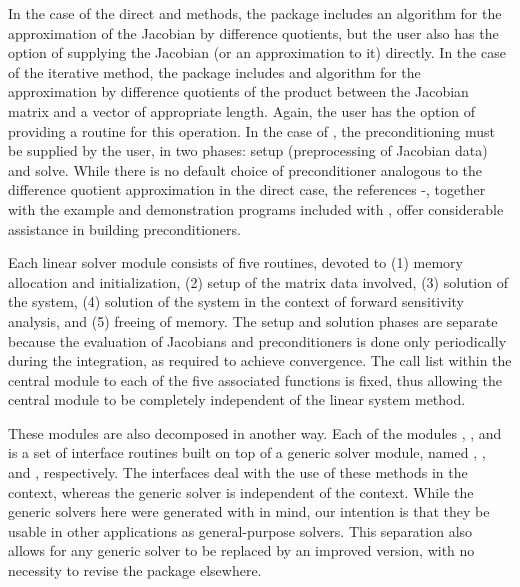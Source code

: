 In the case of the direct {\cvdense} and {\cvband} methods, the package includes
an algorithm for the approximation of the Jacobian by difference
quotients, but the user also has the option of supplying the Jacobian
(or an approximation to it) directly. In the case of the iterative
{\cvspgmr} method, the package includes and algorithm for the approximation
by difference quotients of the product between the Jacobian matrix and
a vector of appropriate length. Again, the user has the option of providing
a routine for this operation.
In  the case of {\cvspgmr}, 
the preconditioning must be supplied by the user, in two phases: 
setup (preprocessing of Jacobian data) and solve.
While there is no default
choice of preconditioner analogous to the difference quotient
approximation in the direct case, the references
\cite{BrHi:89}-\cite{Byr:92}, together with
the example and demonstration programs included with {\cvodes}, offer
considerable assistance in building preconditioners.

Each {\cvodes} linear solver module consists of five routines, devoted to (1)
memory allocation and initialization, (2) setup of the matrix data
involved, (3) solution of the system, (4) solution of the system in the
context of forward sensitivity analysis, and (5) freeing of memory.  The
setup and solution phases are separate because the evaluation of
Jacobians and preconditioners is done only periodically during the
integration, as required to achieve convergence. The call list within
the central {\cvodes} module to each of the five associated functions is
fixed, thus allowing the central module to be completely independent
of the linear system method.

These modules are also decomposed in another way.
Each of the modules {\cvdense}, {\cvband}, and {\cvspgmr} is a set of 
interface routines built on top of a generic solver module, 
named {\dense}, {\band}, and {\spgmr}, respectively.  
The interfaces deal with the use of these methods in the {\cvodes} context, 
whereas the generic solver is independent of the context.
While the generic solvers here were generated with {\sundials} in mind, our
intention is that they be usable in other applications as
general-purpose solvers.  This separation also allows for any generic
solver to be replaced by an improved version, with no necessity to
revise the {\cvodes} package elsewhere.

